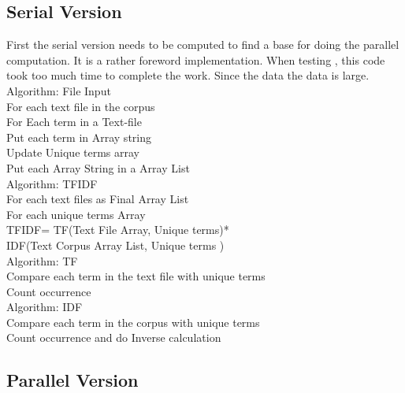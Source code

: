 \documentclass{bigdata}
\newcommand\tab[1][1cm]{\hspace*{#1}}
\begin{document}
\subsection{Serial Version}
First the serial version needs to be computed to find a base for doing the parallel computation. It is a rather foreword implementation. When testing , this code took too much time to complete the work. Since the data the data is  large. 
\\
Algorithm: File Input\\
For each text file in the corpus\\
\tab For Each term in a Text-file\\
\tab \tab Put each term in Array string\\
\tab \tab Update Unique terms array\\
\tab Put each Array String in a  Array List\\

Algorithm: TFIDF\\
For each text files as Final Array List\\
\tab For each unique terms Array\\
TFIDF= TF(Text File Array, Unique terms)*\\
IDF(Text Corpus Array List, Unique terms )\\

Algorithm: TF\\
Compare each term in the text file with unique terms\\
 Count occurrence\\
 
 Algorithm: IDF\\
 Compare each term in the corpus with unique terms\\
 Count occurrence and do Inverse calculation\\
\subsection{Parallel Version}
\end{document}
